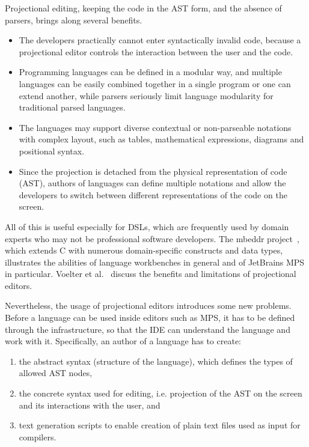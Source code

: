 Projectional editing, keeping the code in the AST form, and the absence of parsers, brings along several benefits.
\begin{itemize}
	\item The developers practically cannot enter syntactically invalid code, because a projectional editor controls the interaction between the user and the code.
	\item Programming languages can be defined in a modular way, and multiple languages can be easily combined together in a single program or one can extend another, while parsers seriously limit language modularity for traditional parsed languages.
	\item The languages may support diverse contextual or non-parseable notations with complex layout, such as tables, mathematical expressions, diagrams and positional syntax.
	\item Since the projection is detached from the physical representation of code (AST), authors of languages can define multiple notations and allow the developers to switch between different representations of the code on the screen.
\end{itemize}
All of this is useful especially for DSLs, which are frequently used by domain experts who may not be professional software developers.
The mbeddr project~\cite{ref:MBEDDR}, which extends C with numerous domain-specific constructs and data types, illustrates the abilities of language workbenches in general and of JetBrains MPS in particular.
Voelter et al.~\cite{ref:VSB14} discuss the benefits and limitations of projectional editors.

Nevertheless, the usage of projectional editors introduces some new problems.
Before a language can be used inside editors such as MPS, it has to be defined through the  infrastructure, so that the IDE can understand the language and work with it.
Specifically, an author of a language has to create:
\begin{enumerate}
	\item the abstract syntax (structure of the language), which defines the types of allowed AST nodes,
	\item the concrete syntax used for editing, i.e. projection of the AST on the screen and its interactions with the user, and
	\item text generation scripts to enable creation of plain text files used as input for compilers.
\end{enumerate}	


